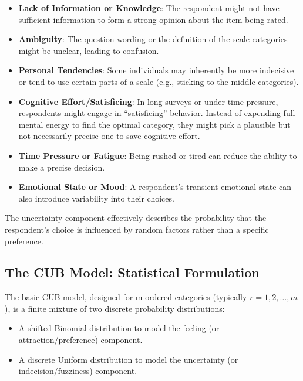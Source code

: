 \documentclass[
  letterpaper,
  DIV=11,
  numbers=noendperiod]{scrartcl}
\providecommand{\tightlist}{%
  \setlength{\itemsep}{0pt}\setlength{\parskip}{0pt}}\usepackage{longtable,booktabs,array}
\begin{document}
\begin{itemize}
\item
  \textbf{Lack of Information or Knowledge}: The respondent might not
  have sufficient information to form a strong opinion about the item
  being rated.
\item
  \textbf{Ambiguity}: The question wording or the definition of the
  scale categories might be unclear, leading to confusion.
\item
  \textbf{Personal Tendencies}: Some individuals may inherently be more
  indecisive or tend to use certain parts of a scale (e.g., sticking to
  the middle categories).
\item
  \textbf{Cognitive Effort/Satisficing}: In long surveys or under time
  pressure, respondents might engage in ``satisficing'' behavior.
  Instead of expending full mental energy to find the optimal category,
  they might pick a plausible but not necessarily precise one to save
  cognitive effort.
\item
  \textbf{Time Pressure or Fatigue}: Being rushed or tired can reduce
  the ability to make a precise decision.
\item
  \textbf{Emotional State or Mood}: A respondent's transient emotional
  state can also introduce variability into their choices.
\end{itemize}

The uncertainty component effectively describes the probability that the
respondent's choice is influenced by random factors rather than a
specific preference.

\hypertarget{the-cub-model-statistical-formulation}{%
\subsection{The CUB Model: Statistical
Formulation}\label{the-cub-model-statistical-formulation}}

The basic CUB model, designed for m ordered categories (typically
\(r=1,2,\dots,m\)), is a finite mixture of two discrete probability
distributions:

\begin{itemize}
\tightlist
\item
  A shifted Binomial distribution to model the feeling (or
  attraction/preference) component.
\item
  A discrete Uniform distribution to model the uncertainty (or
  indecision/fuzziness) component.
\end{itemize}
\end{document}

